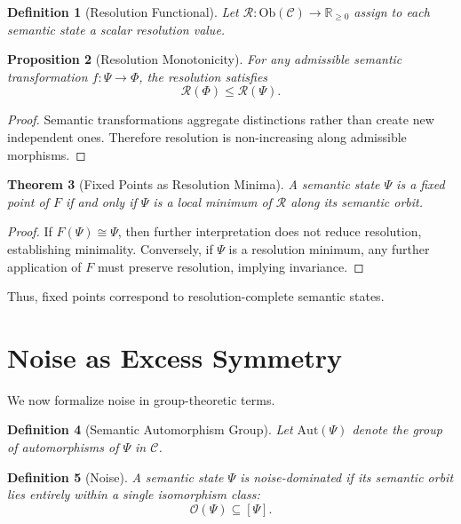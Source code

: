 \documentclass[12pt]{article}
\newtheorem{theorem}{Theorem}[section]
\newtheorem{definition}[theorem]{Definition}
\newtheorem{proposition}[theorem]{Proposition}
\theoremstyle{remark}
\begin{document}
\begin{definition}[Resolution Functional]
Let $\mathcal{R} : \mathrm{Ob}(\mathcal{C}) \to \mathbb{R}_{\ge 0}$ assign to each semantic state a scalar resolution value.
\end{definition}

\begin{proposition}[Resolution Monotonicity]
For any admissible semantic transformation $f : \Psi \to \Phi$, the resolution satisfies
\[
\mathcal{R}(\Phi) \le \mathcal{R}(\Psi).
\]
\end{proposition}

\begin{proof}
Semantic transformations aggregate distinctions rather than create new independent ones. Therefore resolution is non-increasing along admissible morphisms.
\end{proof}

\begin{theorem}[Fixed Points as Resolution Minima]
A semantic state $\Psi$ is a fixed point of $F$ if and only if $\Psi$ is a local minimum of $\mathcal{R}$ along its semantic orbit.
\end{theorem}

\begin{proof}
If $F(\Psi) \cong \Psi$, then further interpretation does not reduce resolution, establishing minimality. Conversely, if $\Psi$ is a resolution minimum, any further application of $F$ must preserve resolution, implying invariance.
\end{proof}

Thus, fixed points correspond to resolution-complete semantic states.

\section{Noise as Excess Symmetry}

We now formalize noise in group-theoretic terms.

\begin{definition}[Semantic Automorphism Group]
Let $\mathrm{Aut}(\Psi)$ denote the group of automorphisms of $\Psi$ in $\mathcal{C}$.
\end{definition}

\begin{definition}[Noise]
A semantic state $\Psi$ is noise-dominated if its semantic orbit lies entirely within a single isomorphism class:
\[
\mathcal{O}(\Psi) \subseteq [\Psi].
\]
\end{definition}
\end{document}
